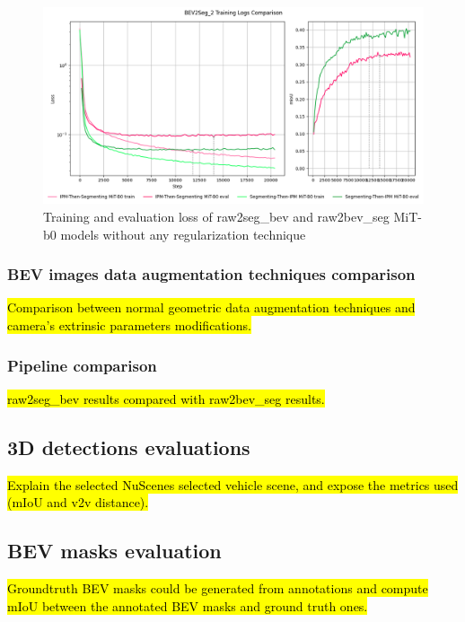 \begin{figure}[h!]
    \centering
    \includegraphics[width=\linewidth]{./images/experiments/overfitting_bev_nu.png}
    \caption{Training and evaluation loss of raw2seg\_bev and raw2bev\_seg MiT-b0 models without any regularization technique}
    \label{fig:overfitting_mit-b0}
\end{figure}



\subsubsection{BEV images data augmentation techniques comparison}
\hl{Comparison between normal geometric data augmentation techniques and camera's extrinsic parameters modifications.}


\subsubsection{Pipeline comparison}
\hl{raw2seg\_bev results compared with raw2bev\_seg results.}

\subsection{3D detections evaluations}
\hl{Explain the selected NuScenes selected vehicle scene, and expose the metrics used (mIoU and v2v distance).}

\subsection{BEV masks evaluation}
\hl{Groundtruth BEV masks could be generated from annotations and compute mIoU between the annotated BEV masks and ground truth ones.}

